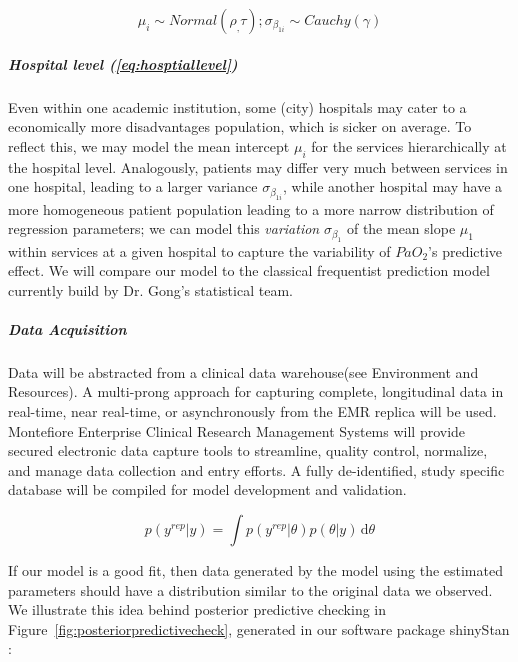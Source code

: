 \documentclass[11pt,notitlepage]{article}
\begin{document}
\begin{figure}
\vspace{-10pt}
\begin{equation} \label{eq:hosptiallevel}
 \mu_i \sim Normal(\rho_, \tau); \sigma_{\beta_{1i}} \sim Cauchy(\gamma)
\end{equation}
\vspace{-25pt}
\end{figure}

\subparagraph*{Hospital level (\ref{eq:hosptiallevel})}
Even within one academic institution, some (city) hospitals may cater to a economically more disadvantages population, which is sicker on average. To reflect this, we may  model the mean intercept $\mu_i$ for the services hierarchically at the hospital level. Analogously, patients may differ very much between services in one hospital, leading to a larger variance $\sigma_{\beta_{1i}}$, while another hospital may have a more homogeneous patient population leading to a more narrow distribution of regression parameters; we can model this \textit{variation} $\sigma_{\beta_1}$ of the mean slope $\mu_1$ within services at a given hospital to capture the variability of $PaO_2$'s predictive effect. We will compare our model to the classical frequentist prediction model currently build by Dr. Gong's statistical team.

\subparagraph*{Data Acquisition}
Data will be abstracted from a clinical data warehouse(see Environment and Resources). A multi-prong approach for capturing complete, longitudinal data in real-time, near real-time, or asynchronously from the EMR replica will be used. Montefiore Enterprise Clinical Research Management Systems will provide secured electronic data capture tools to streamline, quality control, normalize, and manage data collection and entry efforts. A fully de-identified, study specific database will be compiled for model development and validation.
\begin{figure}
\vspace{-20pt}
\begin{equation} \label{eq:predictivecheck}
 p(y^{rep}|y)  = \int \! p(y^{rep}|\theta) p(\theta|y) \, \mathrm{d}\theta 
\end{equation}
\vspace{-20pt}
\end{figure}
If our model is a good fit, then data generated by the model using the estimated parameters should have a distribution similar to the original data we observed. We illustrate this idea behind posterior predictive checking \cite{Gelman_predictive_2000} in Figure~\ref{fig:posteriorpredictivecheck}, generated in our software package shinyStan \cite{shinystan-software:2015}:
\end{document}
